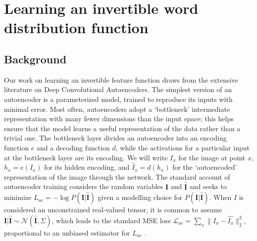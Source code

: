 \section{Learning an invertible word distribution function} \label{sec:learning-features}
\subsection{Background}
Our work on learning an invertible feature function draws from the extensive literature on Deep Convolutional Autoencoders. The simplest version of an autoencoder is a parameterized model, trained to reproduce its inputs with minimal error. Most often, autoencoders adopt a `bottleneck' intermediate representation with many fewer dimensions than the input space; this helps ensure that the model learns a useful representation of the data rather than a trivial one. The bottleneck layer divides an autoencoder into an encoding function $e$ and a decoding function $d$, while the activations for a particular input at the bottleneck layer are its encoding. We will write $I_x$ for the image at point $x$, $h_x = e(I_x)$ for its hidden encoding, and $\hat{I}_x = d(h_x)$ for the `autoencoded' representation of the image through the network. The standard account of autoencoder training considers the random variables $\mathbf{I}$ and $\mathbf{\hat{I}}$ and seeks to minimize $L_{ae} = -\log P(\mathbf{I} | \mathbf{\hat{I}})$ given a modelling choice for $P(\mathbf{I} | \mathbf{\hat{I}})$. When $I$ is considered an unconstrained real-valued tensor, it is common to assume $\mathbf{I}|\mathbf{\hat{I}} \sim \mathcal{N}(\mathbf{\hat{I}}, \Sigma)$, which leads to the standard MSE loss $\mathcal{L}_{ae} = \sum_x \| I_x - \hat{I_x}\|_2^2$, proportional to an unbiased estimator for $L_{ae}$ \citep{vincent2010stacked}.

